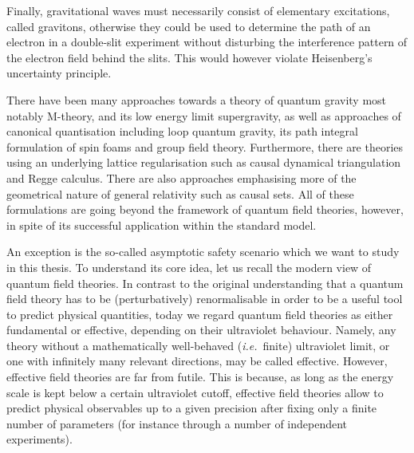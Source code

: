 \documentclass[11pt]{book}
\newcommand\ie{\textit{i.e.}\ }
\numberwithin{equation}{chapter}
\begin{document}
Finally, gravitational waves must necessarily consist of elementary excitations, called gravitons,
otherwise they could be used to determine the path of an electron in a double-slit experiment
without disturbing the interference pattern of the electron field behind the slits. This would
however violate Heisenberg's uncertainty principle.

There have been many approaches towards a theory of quantum gravity
most notably M-theory,
and its low energy limit supergravity,
as well as approaches of canonical quantisation including loop
quantum gravity, its path integral formulation of spin foams and
group field theory. Furthermore, there are theories using an underlying
lattice regularisation such as causal dynamical triangulation and
Regge calculus. There are also approaches emphasising more of the geometrical
nature of general relativity such as causal sets.
All of these formulations are going beyond the framework of quantum
field theories, however, in spite of its successful application within the standard model.

An exception is the so-called asymptotic safety scenario which we want to study
in this thesis. To understand its core idea, let us recall the modern view of
quantum field theories. In contrast to the original understanding that a quantum
field theory has to be (perturbatively) renormalisable in order to be a useful
tool to predict physical quantities, today we regard quantum field theories
as either fundamental or effective, depending on their ultraviolet behaviour.
Namely, any theory without a mathematically well-behaved (\ie finite) ultraviolet
limit, or one with infinitely many relevant directions, may be called effective.
However, effective field theories are far from futile.
This is because, as long as the energy scale is kept below a certain ultraviolet cutoff,
effective field theories allow to predict physical observables up to a given precision
after fixing only a finite number of parameters
(for instance through a number of independent experiments).
\end{document}
